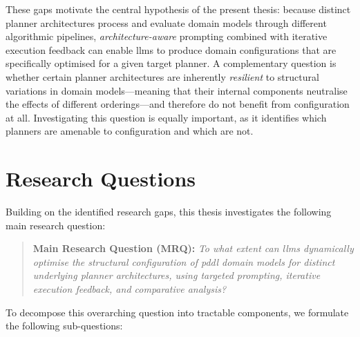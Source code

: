 These gaps motivate the central hypothesis of the present thesis: because distinct planner architectures process and evaluate domain models through different algorithmic pipelines, \emph{architecture-aware} prompting combined with iterative execution feedback can enable \glspl{llm} to produce domain configurations that are specifically optimised for a given target planner.
A complementary question is whether certain planner architectures are inherently \emph{resilient} to structural variations in domain models---meaning that their internal components neutralise the effects of different orderings---and therefore do not benefit from configuration at all.
Investigating this question is equally important, as it identifies which planners are amenable to configuration and which are not.

\section{Research Questions}
\label{sec:intro:research_questions}

Building on the identified research gaps, this thesis investigates the following main research question:

\begin{quote}
  \textbf{Main Research Question (MRQ):}
  \emph{To what extent can \glspl{llm} dynamically optimise the structural configuration of \gls{pddl} domain models for distinct underlying planner architectures, using targeted prompting, iterative execution feedback, and comparative analysis?}
\end{quote}

To decompose this overarching question into tractable components, we formulate the following sub-questions:

